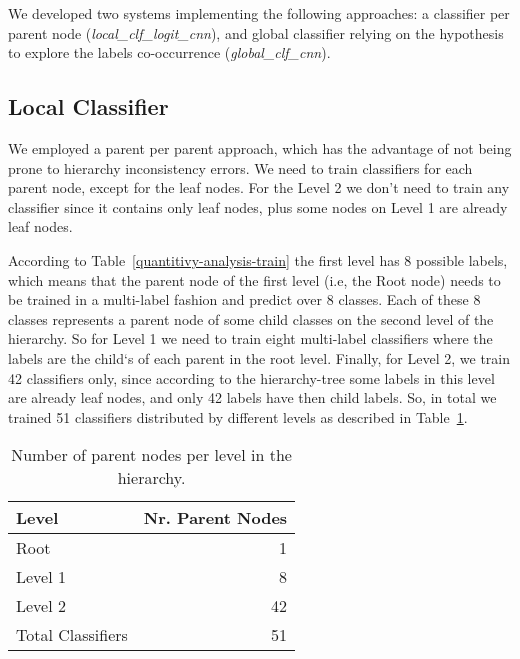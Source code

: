 \documentclass[11pt,a4paper]{article}
\begin{document}
We developed two systems implementing the following approaches: a classifier per
parent node (\textit{local\_clf\_logit\_cnn}), and global classifier relying
on the hypothesis to explore the labels co-occurrence (\textit{global\_clf\_cnn}).

\subsection{Local Classifier}

We employed a parent per parent approach, which has the advantage of not being
prone to hierarchy inconsistency errors. We need to train classifiers for each
parent node, except for the leaf nodes. For the Level 2 we don't need to train
any classifier since it contains only leaf nodes, plus some nodes on Level 1
are already leaf nodes.

According to Table~\ref{quantitivy-analysis-train} the first level has 8 possible
labels, which means that the parent node of the first level (i.e, the Root node)
needs to be trained in a multi-label fashion and predict over 8 classes. Each of
these 8 classes represents a parent node of some child classes on the
second level of the hierarchy. So for Level 1 we need to train eight multi-label
classifiers where the labels are the child`s of each parent in the root level.
Finally, for Level 2, we train 42 classifiers only, since according to the
hierarchy-tree some labels in this level are already leaf nodes, and only 42
labels have then child labels. So, in total we trained 51 classifiers
distributed by different levels as described in Table~\ref{parent-per-node-classifiers}.

\begin{table}[!h]
\begin{center}
\begin{tabular}{|l|r|}
\hline\centering\textbf{Level}  &  \textbf{Nr. Parent Nodes}    \\
\hline
Root              &  1       \\
Level 1           &  8       \\
Level 2           &  42      \\
\hline
Total Classifiers & 51       \\
\hline
\end{tabular}
\end{center}
\caption{\label{parent-per-node-classifiers}Number of parent nodes per level in
the hierarchy.}
\end{table}
\end{document}
